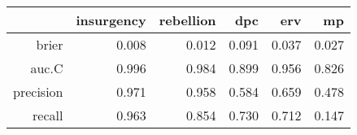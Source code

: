 \begin{tabular}{rrrrrr}
  \hline
 & insurgency & rebellion & dpc & erv & mp \\ 
  \hline
brier & 0.008 & 0.012 & 0.091 & 0.037 & 0.027 \\ 
  auc.C & 0.996 & 0.984 & 0.899 & 0.956 & 0.826 \\ 
  precision & 0.971 & 0.958 & 0.584 & 0.659 & 0.478 \\ 
  recall & 0.963 & 0.854 & 0.730 & 0.712 & 0.147 \\ 
   \hline
\end{tabular}
